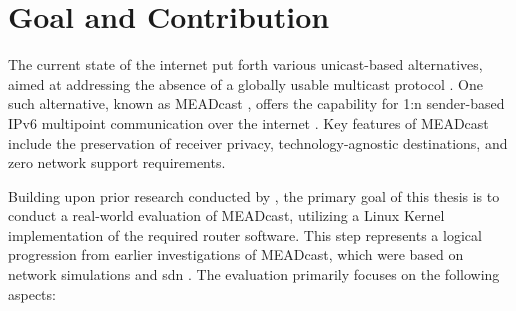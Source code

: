 

\section{Goal and Contribution} %
\label{sec:Contribution}



The current state of the internet put forth various unicast-based alternatives,
    aimed at addressing the absence of a globally usable multicast protocol
    \cite{universal_mc}.
One such alternative, known as MEADcast \cite{meadcast1}, offers the capability
    for 1:n sender-based IPv6 multipoint communication over the internet
    \cite{meadcast2}.
Key features of MEADcast include the preservation of receiver privacy,
    technology-agnostic destinations, and zero network support requirements.

Building upon prior research conducted by \citeauthor{meadcast2}
    \cite{meadcast2}, the primary goal of this thesis is to conduct a
    real-world evaluation of MEADcast, utilizing a Linux Kernel implementation
    of the required router software.
This step represents a logical progression from earlier investigations of
    MEADcast, which were based on network simulations \cite{meadcast1} and
    \gls{sdn} \cite{sdn_ba}.
The evaluation primarily focuses on the following aspects:

